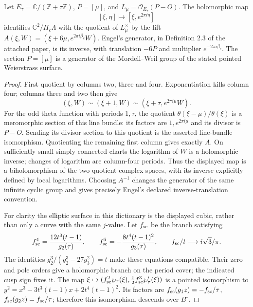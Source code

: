\begin{proposition}[B.1.1; Proved]\label{st:B.1.1}
Let $E_\tau=\mathbb C/(\mathbb Z+\tau\mathbb Z)$, $P=[\mu]$, and $L_\mu=\mathcal O_{E_\tau}(P-O)$. The holomorphic map
\[
 [\xi,\eta]\longmapsto[\xi,e^{2\pi i\eta}]
\]
identifies $\mathbb C^2/\Pi_c\Lambda$ with the quotient of $L_\mu^\times$ by the lift
$A(\xi,W)=(\xi+6\mu,e^{2\pi i\beta_c}W)$. Engel's generator, in Definition 2.3 of the attached paper, is its inverse, with translation $-6P$ and multiplier $e^{-2\pi i\beta_c}$. The section $P=[\mu]$ is a generator of the Mordell--Weil group of the stated pointed Weierstrass surface.
\end{proposition}
\begin{proof}
First quotient by columns two, three and four. Exponentiation kills column four; columns three and two then give
\[
 (\xi,W)\sim(\xi+1,W)\sim(\xi+\tau,e^{2\pi i\mu}W).
\]
For the odd theta function with periods $1,\tau$, the quotient $\theta(\xi-\mu)/\theta(\xi)$ is a meromorphic section of this line bundle: its factors are $1,e^{2\pi i\mu}$ and its divisor is $P-O$. Sending its divisor section to this quotient is the asserted line-bundle isomorphism. Quotienting the remaining first column gives exactly $A$. On sufficiently small simply connected charts the logarithm of $W$ is a holomorphic inverse; changes of logarithm are column-four periods. Thus the displayed map is a biholomorphism of the two quotient complex spaces, with its inverse explicitly defined by local logarithms. Choosing $A^{-1}$ changes the generator of the same infinite cyclic group and gives precisely Engel's declared inverse-translation convention.

For clarity the elliptic surface in this dictionary is the displayed cubic, rather than only a curve with the same $j$-value. Let $f_{\rm sc}$ be the branch satisfying
\[
 f_{\rm sc}^4=\frac{12t^3(t-1)}{g_2(\tau)},\qquad
 f_{\rm sc}^6=-\frac{8t^4(t-1)^2}{g_3(\tau)},\qquad
 f_{\rm sc}/t\longrightarrow i\sqrt3/\pi.
\]
The identities $g_2^3/(g_2^3-27g_3^2)=t$ make these equations compatible. Their zero and pole orders give a holomorphic branch on the period cover; the indicated cusp sign fixes it. The map $\xi\mapsto(f_{\rm sc}^2\wp_\tau(\xi),\frac12f_{\rm sc}^3\wp'_\tau(\xi))$ is a pointed isomorphism to
$y^2=x^3-3t^3(t-1)x+2t^4(t-1)^2$. Its factors are $f_{\rm sc}(g_1z)=-f_{\rm sc}/\tau$, $f_{\rm sc}(g_2z)=f_{\rm sc}/\tau$; therefore this isomorphism descends over $B^\circ$.


\end{proof}

